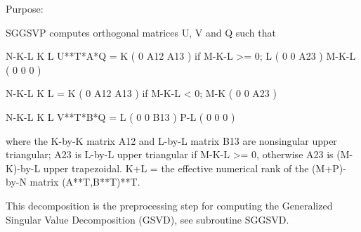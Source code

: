  \begin{DoxyParagraph}{Purpose\+: }
\begin{DoxyVerb} SGGSVP computes orthogonal matrices U, V and Q such that

                    N-K-L  K    L
  U**T*A*Q =     K ( 0    A12  A13 )  if M-K-L >= 0;
                 L ( 0     0   A23 )
             M-K-L ( 0     0    0  )

                  N-K-L  K    L
         =     K ( 0    A12  A13 )  if M-K-L < 0;
             M-K ( 0     0   A23 )

                  N-K-L  K    L
  V**T*B*Q =   L ( 0     0   B13 )
             P-L ( 0     0    0  )

 where the K-by-K matrix A12 and L-by-L matrix B13 are nonsingular
 upper triangular; A23 is L-by-L upper triangular if M-K-L >= 0,
 otherwise A23 is (M-K)-by-L upper trapezoidal.  K+L = the effective
 numerical rank of the (M+P)-by-N matrix (A**T,B**T)**T. 

 This decomposition is the preprocessing step for computing the
 Generalized Singular Value Decomposition (GSVD), see subroutine
 SGGSVD.\end{DoxyVerb}
 
\end{DoxyParagraph}

